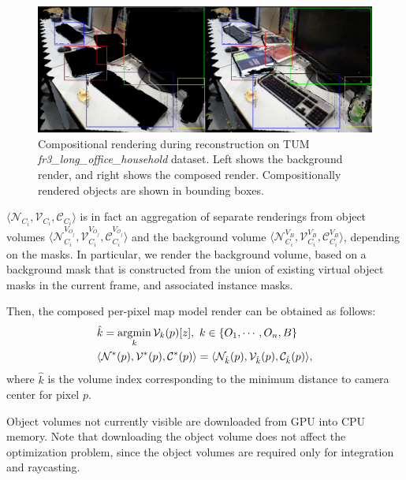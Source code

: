 \begin{figure}[t!]
    \centering
    \includegraphics[width=\linewidth]{figs/compositional-render.pdf}\vspace{-5mm}
    \caption{Compositional rendering during reconstruction on TUM \textit{fr3\_long\_office\_household} dataset. Left shows the background render, and right shows the composed render. Compositionally rendered objects are shown in bounding boxes.}
    \vspace*{-1em}
    \label{fig:compositional_render}
\end{figure}

\(\langle \mathcal{N}_{C_i}, \mathcal{V}_{C_i}, \mathcal{C}_{C_i} \rangle \) is in fact an aggregation of separate renderings from object volumes \(\langle \mathcal{N}_{C_i}^{V_{{O}_j}}, \mathcal{V}_{C_i}^{V_{{O}_j}}, \mathcal{C}_{C_i}^{V_{\mathcal{O}_j}} \rangle \) and the background volume \(\langle \mathcal{N}_{C_i}^{V_{B}}, \mathcal{V}_{C_i}^{V_{B}}, \mathcal{C}_{C_i}^{V_{{B}}}  \rangle \), depending on the masks. In particular, we render the background volume, based on a background mask that is constructed from the union of existing virtual object masks in the current frame, and associated instance masks.

Then, the composed per-pixel map model render can be obtained as follows:
\begin{align}
    &\hat{k} = \operatorname*{\arg\!\min}_k \mathcal{V}_k(p)[z], ~k \in \{O_1, \cdots, O_n, B\} \\
    &\langle \mathcal{N}^*(p), \mathcal{V}^*(p), \mathcal{C}^*(p) \rangle = \langle  \mathcal{N}_{\hat{k}}(p), \mathcal{V}_{\hat{k}}(p), \mathcal{C}_{\hat{k}}(p) \rangle,
\end{align}
where $\hat{k}$ is the volume index corresponding to the minimum distance to camera center for pixel $p$.

Object volumes not currently visible are downloaded from GPU into CPU memory. Note that downloading the object volume does not affect the optimization problem, since the object volumes are required only for integration and raycasting.

